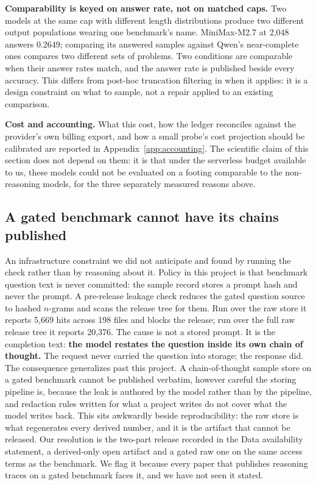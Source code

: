 \documentclass{article}
\begin{document}
\textbf{Comparability is keyed on answer rate, not on matched caps.} Two models
at the same cap with different length distributions produce two different
output populations wearing one benchmark's name. MiniMax-M2.7 at 2,048 answers
0.2649; comparing its answered samples against Qwen's near-complete ones
compares two different sets of problems. Two conditions are comparable when
their answer rates match, and the answer rate is published beside every
accuracy. This differs from post-hoc truncation filtering in when it applies:
it is a design constraint on what to sample, not a repair applied to an
existing comparison.

\textbf{Cost and accounting.} What this cost, how the ledger reconciles
against the provider's own billing export, and how a small probe's cost
projection should be calibrated are reported in
Appendix~\ref{app:accounting}. The scientific claim of this section does not
depend on them: it is that under the serverless budget available to us, these
models could not be evaluated on a footing comparable to the non-reasoning
models, for the three separately measured reasons above.

\subsection{A gated benchmark cannot have its chains published}
\label{sec:cot-release}

An infrastructure constraint we did not anticipate and found by running the
check rather than by reasoning about it. Policy in this project is that
benchmark question text is never committed: the sample record stores a prompt
hash and never the prompt. A pre-release leakage check reduces the gated
question source to hashed $n$-grams and scans the release tree for them. Run
over the raw store it reports 5,669 hits across 198 files and blocks the
release; run over the full raw release tree it reports 20,376. The cause is not
a stored prompt. It is the completion text: \textbf{the model restates the
question inside its own chain of thought.} The request never carried the
question into storage; the response did. The consequence generalizes past this
project. A chain-of-thought sample store on a gated benchmark cannot be
published verbatim, however careful the storing pipeline is, because the leak
is authored by the model rather than by the pipeline, and redaction rules
written for what a project writes do not cover what the model writes back. This
sits awkwardly beside reproducibility: the raw store is what regenerates every
derived number, and it is the artifact that cannot be released. Our resolution
is the two-part release recorded in the Data availability statement, a
derived-only open artifact and a gated raw one on the same access terms as the
benchmark. We flag it because every paper that publishes reasoning traces on a
gated benchmark faces it, and we have not seen it stated.
\end{document}
